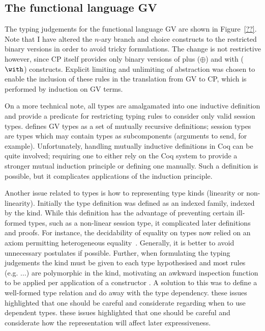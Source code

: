 \subsection{The functional language GV}\label{sec:gv}

%

The typing judgements for the functional language GV are shown in
Figure~\ref{??}. Note that I have altered the $n$-ary branch and choice
constructs to the restricted binary versions in order to avoid tricky
formulations. The change is not restrictive however, since CP itself provides
only binary versions of plus ($\oplus$) and with ($\with$)
constructs. Explicit limiting and unlimiting of abstraction was chosen to
enable the inclusion of these rules in the translation from GV to CP, which is
performed by induction on GV terms.

On a more technical note, all types are amalgamated into one inductive
definition and provide a predicate for restricting typing rules to consider
only valid session types. \citeauthor{Wadler:2014} defines GV types as a set
of mutually recursive definitions; session types are types which may contain
types as subcomponents (arguments to send, for example). Unfortunately,
handling mutually inductive definitions in Coq can be quite involved;
requiring one to either rely on the Coq system to provide a stronger mutual
induction principle or defining one manually. Such a definition is possible,
but it complicates applications of the induction principle.

Another issue related to types is how to representing type kinds (linearity or
non-linearity). Initially the type definition was defined as an indexed
family, indexed by the kind. While this definition has the advantage of
preventing certain ill-formed types, such as a non-linear session type, it
complicated later definitions and proofs. For instance, the decidability of
equality on types now relied on an axiom permitting heterogeneous
equality~\cite{??}. Generally, it is better to avoid unnecessary postulates if
possible. Further, when formulating the typing judgements the kind must be
given to each type hypothesised and most rules (e.g. ...) are polymorphic in
the kind, motivating an awkward inspection function to be applied per
application of a constructor . A solution to
this was to define a well-formed type relation and do away with the type
dependency. these issues highlighted that one should be careful and
considerate regarding when to use dependent types. these issues highlighted
that one should be careful and considerate how the representation will affect
later expressiveness.

